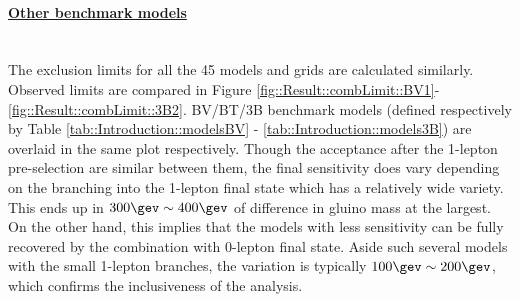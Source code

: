 \clearpage
\paragraph{\underline{\textbf{Other benchmark models}}} \mbox{} \\ 
The exclusion limits for all the 45 models and grids are calculated similarly. 
Observed limits are compared in Figure \ref{fig::Result::combLimit::BV1}-\ref{fig::Result::combLimit::3B2}. 
BV/BT/3B benchmark models (defined respectively by Table \ref{tab::Introduction::modelsBV} - \ref{tab::Introduction::models3B}) are overlaid in the same plot respectively. 
Though the acceptance after the 1-lepton pre-selection are similar between them, the final sensitivity does vary depending on the branching into the 1-lepton final state which has a relatively wide variety. This ends up in $300\gev\sim400\gev$ of difference in gluino mass at the largest. On the other hand, this implies that the models with less sensitivity can be fully recovered by the combination with 0-lepton final state. Aside such several models with the small 1-lepton branches, the variation is typically $100\gev\sim200\gev$, which confirms the inclusiveness of the analysis.








